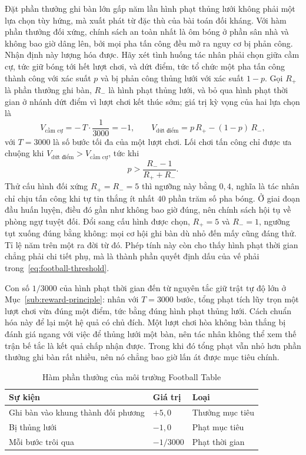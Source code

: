 \indent Đặt phần thưởng ghi bàn lớn gấp năm lần hình phạt thủng lưới không phải một lựa
chọn tùy hứng, mà xuất phát từ đặc thù của bài toán đối kháng. Với hàm phần thưởng đối
xứng, chính sách an toàn nhất là ôm bóng ở phần sân nhà và không bao giờ dâng lên, bởi mọi
pha tấn công đều mở ra nguy cơ bị phản công. Nhận định này lượng hóa được. Hãy xét tình
huống tác nhân phải chọn giữa cầm cự, tức giữ bóng tới hết lượt chơi, và dứt điểm, tức tổ
chức một pha tấn công thành công với xác suất $p$ và bị phản công thủng lưới với xác suất
$1 - p$. Gọi $R_{+}$ là phần thưởng ghi bàn, $R_{-}$ là hình phạt thủng lưới, và bỏ qua
hình phạt thời gian ở nhánh dứt điểm vì lượt chơi kết thúc sớm; giá trị kỳ vọng của hai
lựa chọn là
\begin{equation}
V_{\text{cầm cự}} = -\,T \cdot \frac{1}{3000} = -1 ,
\qquad
V_{\text{dứt điểm}} = p\,R_{+} - (1-p)\,R_{-} ,
\label{eq:football-tradeoff}
\end{equation}
với $T = 3000$ là số bước tối đa của một lượt chơi. Lối chơi tấn công chỉ được ưa
chuộng khi $V_{\text{dứt điểm}} > V_{\text{cầm cự}}$, tức khi
\begin{equation}
p > \frac{R_{-} - 1}{R_{+} + R_{-}} .
\label{eq:football-threshold}
\end{equation}
Thử cấu hình đối xứng $R_{+} = R_{-} = 5$ thì ngưỡng này bằng $0{,}4$, nghĩa là tác nhân
chỉ chịu tấn công khi tự tin thắng ít nhất $40$ phần trăm số pha bóng. Ở giai đoạn đầu
huấn luyện, điều đó gần như không bao giờ đúng, nên chính sách hội tụ về phòng ngự tuyệt
đối. Đổi sang cấu hình được chọn, $R_{+} = 5$ và $R_{-} = 1$, ngưỡng tụt xuống đúng bằng
không: mọi cơ hội ghi bàn dù nhỏ đến mấy cũng đáng thử. Tỉ lệ năm trên một ra đời từ đó.
Phép tính này còn cho thấy hình phạt thời gian chẳng phải chi tiết phụ, mà là thành phần
quyết định dấu của vế phải trong~\eqref{eq:football-threshold}.

\indent Con số $1/3000$ của hình phạt thời gian đến từ nguyên tắc giữ trật tự độ lớn ở
Mục~\ref{sub:reward-principle}: nhân với $T = 3000$ bước, tổng phạt tích lũy trọn một lượt
chơi vừa đúng một điểm, tức bằng đúng hình phạt thủng lưới. Cách chuẩn hóa này để lại một
hệ quả có chủ đích. Một lượt chơi hòa không bàn thắng bị đánh giá ngang với việc để thủng
lưới một bàn, nên tác nhân không thể xem thế trận bế tắc là kết quả chấp nhận được. Trong
khi đó tổng phạt vẫn nhỏ hơn phần thưởng ghi bàn rất nhiều, nên nó chẳng bao giờ lấn át
được mục tiêu chính.

\begin{table}[H]
\centering
\caption{Hàm phần thưởng của môi trường Football Table}
\label{tab:reward_football}
\renewcommand{\arraystretch}{1.4}
\tablefont
\begin{tabular}{|p{6cm}|>{\centering\arraybackslash}p{3cm}|p{4cm}|}
\hline
\textbf{Sự kiện} & \textbf{Giá trị} & \textbf{Loại} \\
\hline
Ghi bàn vào khung thành đối phương & $+5{,}0$ & Thưởng mục tiêu \\
\hline
Bị thủng lưới & $-1{,}0$ & Phạt mục tiêu \\
\hline
Mỗi bước trôi qua & $-1/3000$ & Phạt thời gian \\
\hline
\end{tabular}
\end{table}

